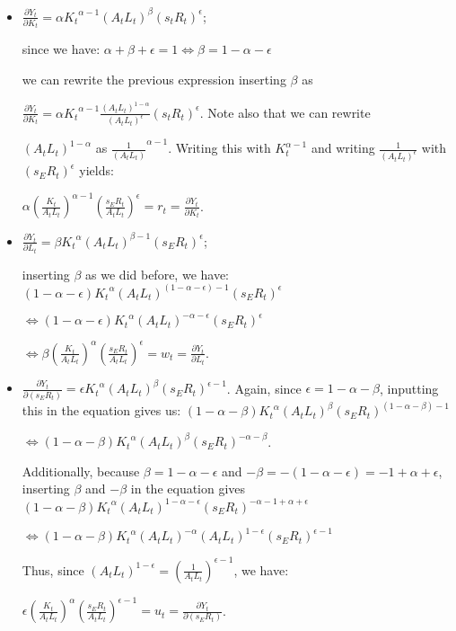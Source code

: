 \documentclass[11pt]{article} %
\begin{document}
\begin{itemize}

    \item $\frac{\partial{Y_t}}{\partial{K_t}} = \alpha{K_t}^{\alpha-1}({A_t}{L_t})^\beta({s_t}{R_t})^\epsilon$;\par since we have: 
    $\alpha+\beta+\epsilon=1 \Leftrightarrow \beta=1-\alpha-\epsilon$ \par we can rewrite the previous expression inserting $\beta$ as \par
    $\frac{\partial{Y_t}}{\partial{K_t}} = \alpha{K_t}^{\alpha-1}\frac{({A_t}{L_t})^{1-\alpha}}{({A_t}{L_t})^\epsilon}({s_t}{R_t})^\epsilon$. Note also that we can rewrite\par
    $({A_t}{L_t})^{1-\alpha}$ as $\frac{1}{({A_t}{L_t})}^{\alpha-1}$. Writing this with $K_t^{\alpha-1}$ and writing $\frac{1}{({A_t}{L_t})^{\epsilon}}$ with $({s_E}{R_t})^{\epsilon}$ yields: \par
    $\alpha(\frac{K_t}{{A_t}{L_t}})^{\alpha-1}(\frac{{s_E}{R_t}}{{A_t}{L_t}})^{\epsilon} = r_t = \frac{\partial{Y_t}}{\partial{K_t}}$.
    
    \bigskip
    \bigskip
    
    \item $\frac{\partial{Y_t}}{\partial{L_t}} = \beta{K_t}^{\alpha}({A_t}{L_t})^{\beta-1}({s_E}{R_t})^\epsilon$;\par
    inserting $\beta$ as we did before, we have: $(1-\alpha-\epsilon){K_t}^{\alpha}({A_t}{L_t})^{(1-\alpha-\epsilon)-1}({s_E}{R_t})^\epsilon$\par
    $\Leftrightarrow(1-\alpha-\epsilon){K_t}^{\alpha}({A_t}{L_t})^{-\alpha-\epsilon}({s_E}{R_t})^\epsilon$ \par
    $\Leftrightarrow \beta(\frac{K_t}{{A_t}{L_t}})^{\alpha}(\frac{{s_E}{R_t}}{{A_t}{L_t}})^{\epsilon} = w_t = \frac{\partial{Y_t}}{\partial{L_t}}$.
    
    \bigskip
    \bigskip
    
    \item $\frac{\partial{Y_t}}{\partial({s_E}{R_t})} = \epsilon{K_t}^{\alpha}({A_t}{L_t})^{\beta}({s_E}{R_t})^{\epsilon-1}$. Again, since $\epsilon = 1-\alpha-\beta$, inputting this in the equation gives us: $(1-\alpha-\beta){K_t}^{\alpha}({A_t}{L_t})^{\beta}({s_E}{R_t})^{(1-\alpha-\beta)-1}$\par
    $\Leftrightarrow(1-\alpha-\beta){K_t}^{\alpha}({A_t}{L_t})^{\beta}({s_E}{R_t})^{-\alpha-\beta}$. \par Additionally, because $\beta = 1-\alpha-\epsilon$ and $-\beta = -(1-\alpha-\epsilon) = -1 + \alpha+\epsilon$, inserting $\beta$ and $-\beta$ in the equation gives $(1-\alpha-\beta){K_t}^{\alpha}({A_t}{L_t})^{1-\alpha-\epsilon}({s_E}{R_t})^{-\alpha-1 + \alpha+\epsilon}$\par
    $\Leftrightarrow (1-\alpha-\beta){K_t}^{\alpha}({A_t}{L_t})^{-\alpha}({A_t}{L_t})^{1-\epsilon}({s_E}{R_t})^{\epsilon-1}$\par
    Thus, since $({A_t}{L_t})^{1-\epsilon} = (\frac{1}{{A_t}{L_t}})^{\epsilon-1}$, we have:\par
    $\epsilon(\frac{K_t}{{A_t}{L_t}})^{\alpha}(\frac{{s_E}{R_t}}{{A_t}{L_t}})^{\epsilon-1} = u_t = \frac{\partial{Y_t}}{\partial({s_E}{R_t})}$.


\end{itemize}
\end{document}
